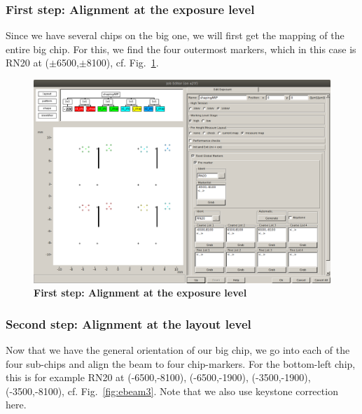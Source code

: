 \subsubsection{First step: Alignment at the exposure level}
%
Since we have several chips on the big one, we will first get the mapping of the entire big chip. 
%
For this, we find the four outermost markers, which in this case is RN20 at ($\pm$6500,$\pm$8100), cf. Fig.~\ref{fig:ebeam2}.

\begin{figure}
	\centering
	\includegraphics[width=\linewidth]{appendix/figs/ebeam2}
	\caption{\textbf{First step: Alignment at the exposure level}}
	\label{fig:ebeam2}
\end{figure}

\subsubsection{Second step: Alignment at the layout level}
%
Now that we have the general orientation of our big chip, we go into each of the four sub-chips and align the beam to four chip-markers. 
%
For the bottom-left chip, this is for example RN20 at (-6500,-8100), (-6500,-1900), (-3500,-1900), (-3500,-8100), cf. Fig.~\ref{fig:ebeam3}.
%
Note that we also use keystone correction here.

